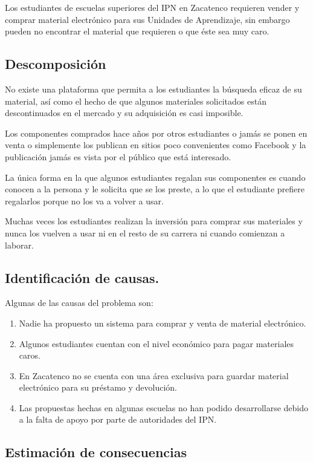 Los estudiantes de escuelas superiores del IPN en Zacatenco requieren vender y comprar material electrónico para sus Unidades de Aprendizaje, sin embargo pueden no encontrar el material que requieren o que éste sea muy caro.

\subsection{Descomposición}

No existe una plataforma que permita a los estudiantes la búsqueda eficaz de su material, así como el hecho de que algunos materiales solicitados están descontinuados en el mercado y su adquisición es casi imposible. 

Los componentes comprados hace años por otros estudiantes o jamás se ponen en venta o simplemente los publican en sitios poco convenientes como Facebook y la publicación jamás es vista por el público que está interesado. 

La única forma en la que algunos estudiantes regalan sus componentes es cuando conocen a la persona y le solicita que se los preste, a lo que el estudiante prefiere regalarlos porque no los va a volver a usar. 

Muchas veces los estudiantes realizan la inversión para comprar sus materiales y nunca los vuelven a usar ni en el resto de su carrera ni cuando comienzan a laborar.

\subsection{Identificación de causas.}

Algunas de las causas del problema son:

\begin{enumerate}
	\item Nadie ha propuesto un sistema para comprar y venta de material electrónico.
	\item Algunos estudiantes cuentan con el nivel económico para pagar materiales caros.
	\item En Zacatenco no se cuenta con una área exclusiva para guardar material electrónico para su préstamo y devolución.
	\item Las propuestas hechas en algunas escuelas no han podido desarrollarse debido a la falta de apoyo por parte de autoridades del IPN.
\end{enumerate}

\subsection{Estimación de consecuencias}
	
